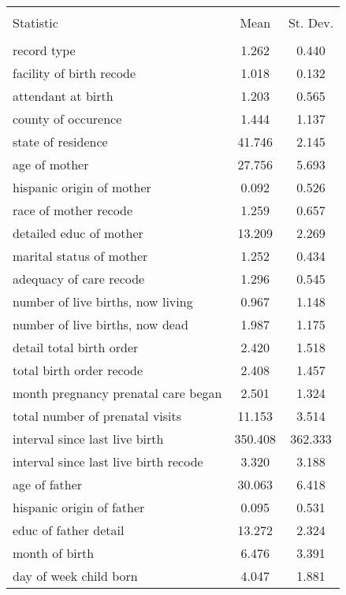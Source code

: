 
\begin{table}[!htbp] \centering 
  \caption{} 
  \label{} 
\small 
\begin{tabular}{@{\extracolsep{5pt}}lcc} 
\\[-1.8ex]\hline \\[-1.8ex] 
Statistic & \multicolumn{1}{c}{Mean} & \multicolumn{1}{c}{St. Dev.} \\ 
\hline 
\hline \\[-1.8ex] 
record type & 1.262 & 0.440 \\ 
facility of birth recode & 1.018 & 0.132 \\ 
attendant at birth & 1.203 & 0.565 \\ 
county of occurence & 1.444 & 1.137 \\ 
state of residence & 41.746 & 2.145 \\ 
age of mother & 27.756 & 5.693 \\ 
hispanic origin of mother & 0.092 & 0.526 \\ 
race of mother recode & 1.259 & 0.657 \\ 
detailed educ of mother & 13.209 & 2.269 \\ 
marital status of mother & 1.252 & 0.434 \\ 
adequacy of care recode & 1.296 & 0.545 \\ 
number of live births, now living & 0.967 & 1.148 \\ 
number of live births, now dead & 1.987 & 1.175 \\ 
detail total birth order & 2.420 & 1.518 \\ 
total birth order recode & 2.408 & 1.457 \\ 
month pregnancy prenatal care began & 2.501 & 1.324 \\ 
total number of prenatal visits & 11.153 & 3.514 \\ 
interval since last live birth & 350.408 & 362.333 \\ 
interval since last live birth recode & 3.320 & 3.188 \\ 
age of father & 30.063 & 6.418 \\ 
hispanic origin of father & 0.095 & 0.531 \\ 
educ of father detail & 13.272 & 2.324 \\ 
month of birth & 6.476 & 3.391 \\ 
day of week child born & 4.047 & 1.881 \\ 

\end{tabular}
\end{table}

